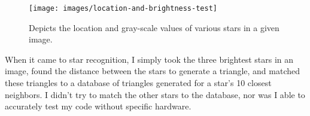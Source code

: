 \begin{figure}[h!] \centering
\texttt{[image: images/location-and-brightness-test]}
\caption{Depicts the location and gray-scale values of various stars in a given
image.} \end{figure}

When it came to star recognition, I simply took the three brightest stars in an
image, found the distance between the stars to generate a triangle, and matched
these triangles to a database of triangles generated for a star's 10 closest
neighbors. I didn't try to match the other stars to the database, nor was I able
to accurately test my code without specific hardware. \smallskip

